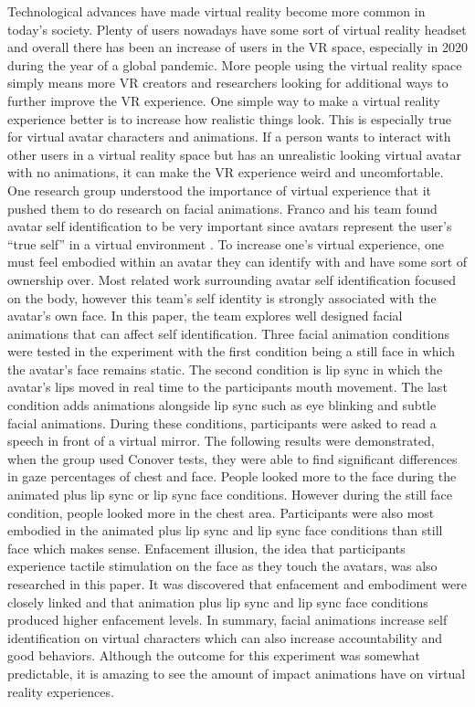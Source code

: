 \documentclass{article}
\begin{document}
Technological advances have made virtual reality become more common in today’s society. Plenty of users nowadays have some sort of virtual reality headset and overall there has been an increase of users in the VR space, especially in 2020 during the year of a global pandemic. More people using the virtual reality space simply means more VR creators and researchers looking for additional ways to further improve the VR experience. One simple way to make a virtual reality experience better is to increase how realistic things look. This is especially true for virtual avatar characters and animations. If a person wants to interact with other users in a virtual reality space but has an unrealistic looking virtual avatar with no animations, it can make the VR experience weird and uncomfortable. One research group understood the importance of virtual experience that it pushed them to do research on facial animations. Franco and his team found avatar self identification to be very important since avatars represent the user’s “true self” in a virtual environment \cite{8998352}. To increase one's virtual experience, one must feel embodied within an avatar they can identify with and have some sort of ownership over. Most related work surrounding avatar self identification focused on the body, however this team’s self identity is strongly associated with the avatar’s own face. In this paper, the team explores well designed facial animations that can affect self identification. Three facial animation conditions were tested in the experiment with the first condition being a still face in which the avatar's face remains static. The second condition is lip sync in which the avatar’s lips moved in real time to the participants mouth movement. The last condition adds animations alongside lip sync such as eye blinking and subtle facial animations. During these conditions, participants were asked to read a speech in front of a virtual mirror. The following results were demonstrated, when the group used Conover tests, they were able to find significant differences in gaze percentages of chest and face. People looked more to the face during the animated plus lip sync or lip sync face conditions. However during the still face condition, people looked more in the chest area. Participants were also most embodied in the animated plus lip sync and lip sync face conditions than still face which makes sense. Enfacement illusion, the idea that participants experience tactile stimulation on the face as they touch the avatars, was also researched in this paper. It was discovered that enfacement and embodiment were closely linked and that animation plus lip sync and lip sync face conditions produced higher enfacement levels. In summary, facial animations increase self identification on virtual characters which can also increase accountability and good behaviors. Although the outcome for this experiment was somewhat predictable, it is amazing to see the amount of impact animations have on virtual reality experiences. 
\end{document}
